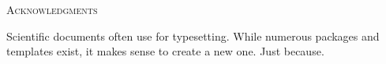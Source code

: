 \newpage
\begin{center}
  {\Huge \textsc{Acknowledgments}}
\end{center}
%
\noindent
%
Scientific documents often use for typesetting.
While numerous packages and templates exist, it makes sense to create a new one.
Just because.

\newpage
\null
\thispagestyle{empty}
\newpage
